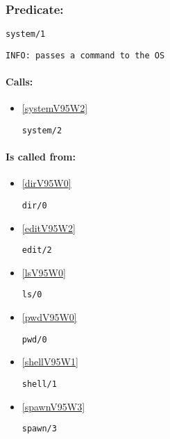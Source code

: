 \subsubsection{Predicate:} \label{systemV95W1}

\begin{verbatim}
system/1
\end{verbatim}

{\small \begin{verbatim}
INFO: passes a command to the OS

\end{verbatim}}
\paragraph{Calls:} 
\begin{itemize}
\item \ref{systemV95W2} 
\begin{verbatim}
system/2
\end{verbatim}

\end{itemize}
\paragraph{Is called from:} 
\begin{itemize}
\item \ref{dirV95W0} 
\begin{verbatim}
dir/0
\end{verbatim}

\item \ref{editV95W2} 
\begin{verbatim}
edit/2
\end{verbatim}

\item \ref{lsV95W0} 
\begin{verbatim}
ls/0
\end{verbatim}

\item \ref{pwdV95W0} 
\begin{verbatim}
pwd/0
\end{verbatim}

\item \ref{shellV95W1} 
\begin{verbatim}
shell/1
\end{verbatim}

\item \ref{spawnV95W3} 
\begin{verbatim}
spawn/3
\end{verbatim}

\end{itemize}

